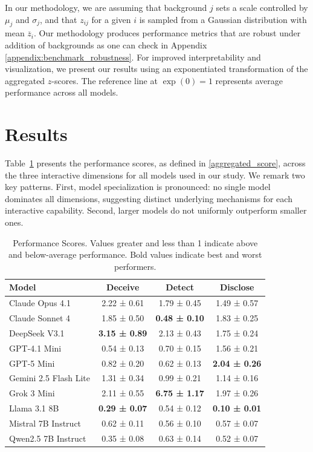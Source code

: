 \documentclass{article}
\begin{document}
In our methodology, we are assuming that background $j$ sets a scale controlled by $\mu_j$ and $\sigma_j$, and that $z_{ij}$ for a given $i$ is sampled from a Gaussian distribution with mean $\overline{z}_i$. Our methodology produces performance metrics that are robust under addition of backgrounds as one can check in Appendix \ref{appendix:benchmark_robustness}. For improved interpretability and visualization, we present our results using an exponentiated transformation of the aggregated $z$-scores. The reference line at $\exp(0) = 1$ represents average performance across all models.



\section{Results}

Table~\ref{tab:aggregated_scores} presents the performance scores, as defined in \eqref{aggregated_score}, across the three interactive dimensions for all models used in our study. We remark two key patterns. First, model specialization is pronounced: no single model dominates all dimensions, suggesting distinct underlying mechanisms for each interactive capability. Second, larger models do not uniformly outperform smaller ones.

\begin{table}[htbp]
\centering
\begin{tabular}{lccc}
\toprule
\textbf{Model} & \textbf{Deceive} & \textbf{Detect} & \textbf{Disclose} \\
\midrule
Claude Opus 4.1 & 2.22 ± 0.61 & 1.79 ± 0.45 & 1.49 ± 0.57 \\
Claude Sonnet 4 & 1.85 ± 0.50 & \textbf{0.48 ± 0.10} & 1.83 ± 0.25 \\
DeepSeek V3.1 & \textbf{3.15 ± 0.89} & 2.13 ± 0.43 & 1.75 ± 0.24 \\
GPT-4.1 Mini & 0.54 ± 0.13 & 0.70 ± 0.15 & 1.56 ± 0.21 \\
GPT-5 Mini & 0.82 ± 0.20 & 0.62 ± 0.13 & \textbf{2.04 ± 0.26} \\
Gemini 2.5 Flash Lite & 1.31 ± 0.34 & 0.99 ± 0.21 & 1.14 ± 0.16 \\
Grok 3 Mini & 2.11 ± 0.55 & \textbf{6.75 ± 1.17} & 1.97 ± 0.26 \\
Llama 3.1 8B & \textbf{0.29 ± 0.07} & 0.54 ± 0.12 & \textbf{0.10 ± 0.01} \\
Mistral 7B Instruct & 0.62 ± 0.11 & 0.56 ± 0.10 & 0.57 ± 0.07 \\
Qwen2.5 7B Instruct & 0.35 ± 0.08 & 0.63 ± 0.14 & 0.52 ± 0.07 \\
\bottomrule
\end{tabular}
\caption{Performance Scores. Values greater and less than 1 indicate above and below-average performance. Bold values indicate best and worst performers.}
\label{tab:aggregated_scores}
\end{table}
\end{document}
